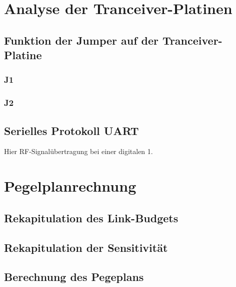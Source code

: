 \section{Analyse der Tranceiver-Platinen}
\subsection{Funktion der Jumper auf der Tranceiver-Platine}
\subsubsection{J1}
\subsubsection{J2}
\subsection{Serielles Protokoll UART}
Hier RF-Signalübertragung bei einer digitalen 1.

\section{Pegelplanrechnung}
\subsection{Rekapitulation des Link-Budgets}
\subsection{Rekapitulation der Sensitivität}
\subsection{Berechnung des Pegeplans}